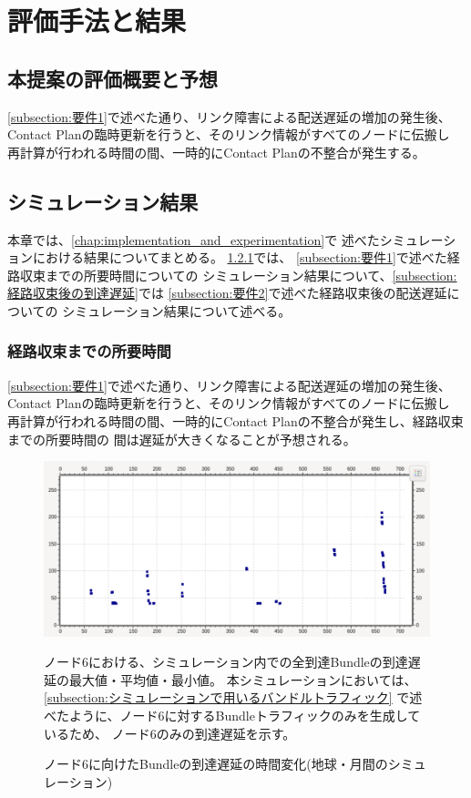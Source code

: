 \chapter{評価手法と結果}
\label{chap:evaluation}
\section{本提案の評価概要と予想}
\ref{subsection:要件1}で述べた通り、リンク障害による配送遅延の増加の発生後、
Contact Planの臨時更新を行うと、そのリンク情報がすべてのノードに伝搬し
再計算が行われる時間の間、一時的にContact Planの不整合が発生する。

\section{シミュレーション結果}
本章では、\ref{chap:implementation_and_experimentation}で
述べたシミュレーションにおける結果についてまとめる。
\ref{subsection:経路収束までの所要時間}では、
\ref{subsection:要件1}で述べた経路収束までの所要時間についての
シミュレーション結果について、\ref{subsection:経路収束後の到達遅延}では
\ref{subsection:要件2}で述べた経路収束後の配送遅延についての
シミュレーション結果について述べる。


\subsection{経路収束までの所要時間}
\label{subsection:経路収束までの所要時間}
\ref{subsection:要件1}で述べた通り、リンク障害による配送遅延の増加の発生後、
Contact Planの臨時更新を行うと、そのリンク情報がすべてのノードに伝搬し
再計算が行われる時間の間、一時的にContact Planの不整合が発生し、経路収束までの所要時間の
間は遅延が大きくなることが予想される。
\begin{figure}[tbh]
    \centering
    \includegraphics[width=0.7\textheight]{img/thesis_sample_delay_time.pdf}
    \caption{ノード6に向けたBundleの到達遅延の時間変化(地球・月間のシミュレーション)}
    \label{fig:delay_time_variation_earth_moon}
    \begin{minipage}{\textwidth}
        \raggedright
        \vspace{3mm}
        ノード6における、シミュレーション内での全到達Bundleの到達遅延の最大値・平均値・最小値。
        本シミュレーションにおいては、\ref{subsection:シミュレーションで用いるバンドルトラフィック}
        で述べたように、ノード6に対するBundleトラフィックのみを生成しているため、
        ノード6のみの到達遅延を示す。
    \end{minipage}
\end{figure}

